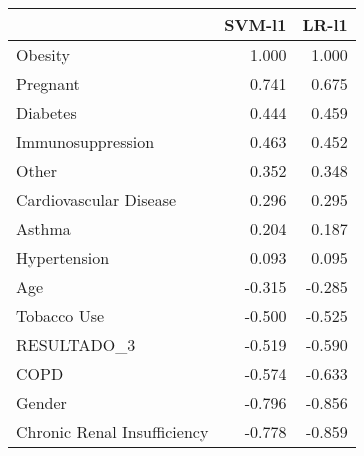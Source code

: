 \begin{tabular}{lrr}
\toprule
{} &  SVM-l1 &  LR-l1 \\
\midrule
Obesity                     &   1.000 &  1.000 \\
Pregnant                    &   0.741 &  0.675 \\
Diabetes                    &   0.444 &  0.459 \\
Immunosuppression           &   0.463 &  0.452 \\
Other                       &   0.352 &  0.348 \\
Cardiovascular Disease      &   0.296 &  0.295 \\
Asthma                      &   0.204 &  0.187 \\
Hypertension                &   0.093 &  0.095 \\
Age                         &  -0.315 & -0.285 \\
Tobacco Use                 &  -0.500 & -0.525 \\
RESULTADO\_3                 &  -0.519 & -0.590 \\
COPD                        &  -0.574 & -0.633 \\
Gender                      &  -0.796 & -0.856 \\
Chronic Renal Insufficiency &  -0.778 & -0.859 \\
\bottomrule
\end{tabular}

